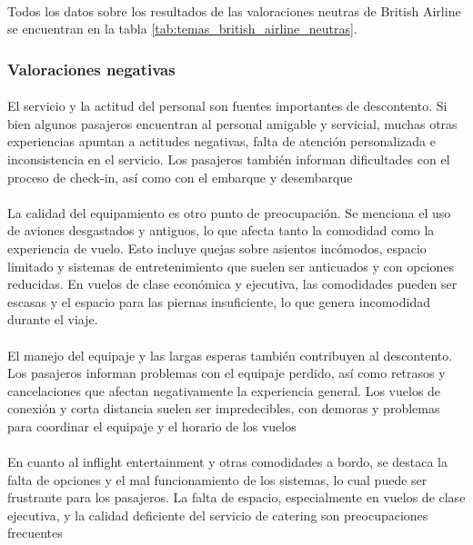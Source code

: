 \documentclass{report}
\begin{document}
{{                    \paragraph*{}{
                        Todos los datos sobre los resultados de las valoraciones neutras de British Airline se encuentran en la tabla \ref{tab:temas_british_airline_neutras}.
                    }
                \subsubsection*{Valoraciones negativas}
                    \paragraph*{}{
                        El servicio y la actitud del personal son fuentes importantes de descontento. Si bien algunos pasajeros encuentran al personal amigable y servicial, muchas otras experiencias apuntan a actitudes negativas, falta de atención personalizada e inconsistencia en el servicio. Los pasajeros también informan dificultades con el proceso de check-in, así como con el embarque y desembarque
                    }
                    \paragraph*{}{
                        La calidad del equipamiento es otro punto de preocupación. Se menciona el uso de aviones desgastados y antiguos, lo que afecta tanto la comodidad como la experiencia de vuelo. Esto incluye quejas sobre asientos incómodos, espacio limitado y sistemas de entretenimiento que suelen ser anticuados y con opciones reducidas. En vuelos de clase económica y ejecutiva, las comodidades pueden ser escasas y el espacio para las piernas insuficiente, lo que genera incomodidad durante el viaje.
                    }
                    \paragraph*{}{
                        El manejo del equipaje y las largas esperas también contribuyen al descontento. Los pasajeros informan problemas con el equipaje perdido, así como retrasos y cancelaciones que afectan negativamente la experiencia general. Los vuelos de conexión y corta distancia suelen ser impredecibles, con demoras y problemas para coordinar el equipaje y el horario de los vuelos
                    }
                    \paragraph*{}{
                        En cuanto al inflight entertainment y otras comodidades a bordo, se destaca la falta de opciones y el mal funcionamiento de los sistemas, lo cual puede ser frustrante para los pasajeros. La falta de espacio, especialmente en vuelos de clase ejecutiva, y la calidad deficiente del servicio de catering son preocupaciones frecuentes
                    }
}}
\end{document}
